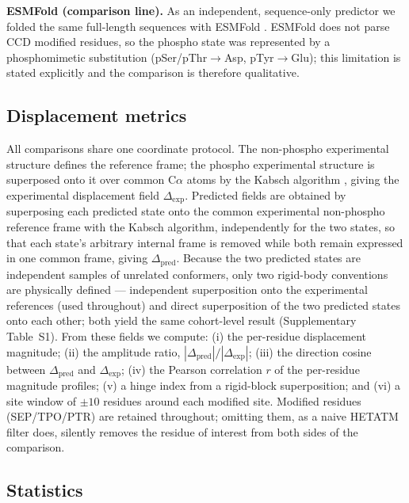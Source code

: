 \noindent\textbf{ESMFold (comparison line).} As an independent,
sequence-only predictor we folded the same full-length sequences with
ESMFold \citep{lin2023evolutionary}. ESMFold does not parse CCD modified residues,
so the phospho state was represented by a phosphomimetic substitution
(pSer/pThr$\rightarrow$Asp, pTyr$\rightarrow$Glu); this limitation is
stated explicitly and the comparison is therefore qualitative.

\subsection{Displacement metrics}
\label{sec:metrics}

All comparisons share one coordinate protocol. The non-phospho
experimental structure defines the reference frame; the phospho
experimental structure is superposed onto it over common C$\alpha$ atoms
by the Kabsch algorithm \citep{kabsch1976solution}, giving the experimental
displacement field $\Delta_{\mathrm{exp}}$. Predicted fields are obtained
by superposing each predicted state onto the common experimental
non-phospho reference frame with the Kabsch algorithm, independently for
the two states, so that each state's arbitrary internal frame is removed
while both remain expressed in one common frame, giving
$\Delta_{\mathrm{pred}}$.
Because the two predicted states are independent samples of unrelated
conformers, only two rigid-body conventions are physically defined ---
independent superposition onto the experimental references (used
throughout) and direct superposition of the two predicted states onto each
other; both yield the same cohort-level result (Supplementary
Table~S1). From these fields we compute:
(i) the per-residue displacement magnitude;
(ii) the amplitude ratio, $|\Delta_{\mathrm{pred}}|/|\Delta_{\mathrm{exp}}|$;
(iii) the direction cosine between $\Delta_{\mathrm{pred}}$ and
$\Delta_{\mathrm{exp}}$;
(iv) the Pearson correlation $r$ of the per-residue magnitude profiles;
(v) a hinge index from a rigid-block superposition; and
(vi) a site window of $\pm10$ residues around each modified site.
Modified residues (SEP/TPO/PTR) are retained throughout; omitting them, as
a naive HETATM filter does, silently removes the residue of interest from
both sides of the comparison.

\subsection{Statistics}
\label{sec:stats}

